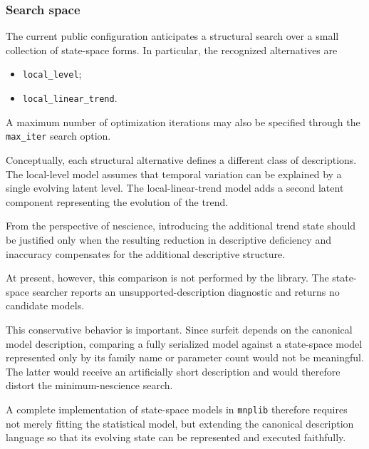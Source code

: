 \subsubsection{Search space}

The current public configuration anticipates a structural search over a small
collection of state-space forms. In particular, the recognized alternatives are

\begin{itemize}
    \item \texttt{local\_level};
    \item \texttt{local\_linear\_trend}.
\end{itemize}

A maximum number of optimization iterations may also be specified through the
\texttt{max\_iter} search option.

Conceptually, each structural alternative defines a different class of
descriptions. The local-level model assumes that temporal variation can be
explained by a single evolving latent level. The local-linear-trend model adds a
second latent component representing the evolution of the trend.

From the perspective of nescience, introducing the additional trend state should
be justified only when the resulting reduction in descriptive deficiency and
inaccuracy compensates for the additional descriptive structure.

At present, however, this comparison is not performed by the library. The
state-space searcher reports an unsupported-description diagnostic and returns no
candidate models.

This conservative behavior is important. Since surfeit depends on the canonical
model description, comparing a fully serialized model against a state-space model
represented only by its family name or parameter count would not be meaningful.
The latter would receive an artificially short description and would therefore
distort the minimum-nescience search.

A complete implementation of state-space models in \texttt{mnplib} therefore
requires not merely fitting the statistical model, but extending the canonical
description language so that its evolving state can be represented and executed
faithfully.